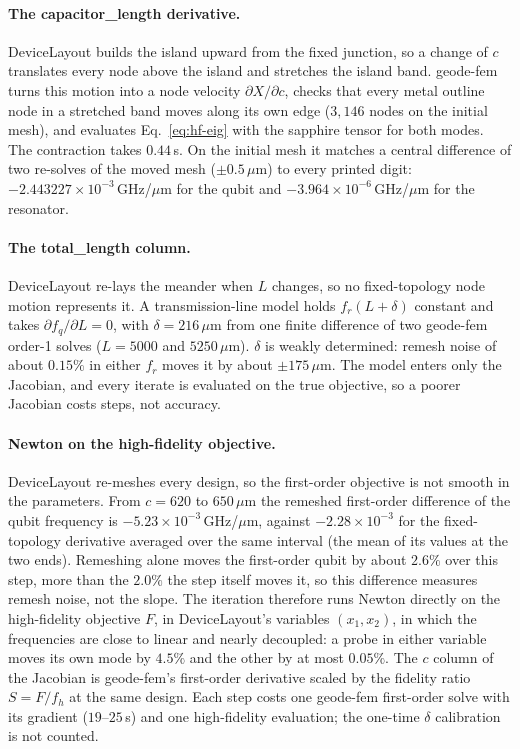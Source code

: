 \documentclass{anvil-paper}
\begin{document}
\paragraph{The capacitor\_length derivative.}
DeviceLayout builds the island upward from the fixed junction, so a change
of $c$ translates every node above the island and stretches the island
band. geode-fem turns this motion into a node velocity
$\partial X/\partial c$, checks that every metal outline node in a
stretched band moves along its own edge ($3{,}146$ nodes on the initial
mesh), and evaluates Eq.~\eqref{eq:hf-eig} with the sapphire tensor for both modes.
The contraction takes $0.44$\,s. On the initial mesh it matches a central
difference of two re-solves of the moved mesh ($\pm0.5\,\mu$m) to every
printed digit: $-2.443227\times10^{-3}$\,GHz/$\mu$m for the qubit and
$-3.964\times10^{-6}$\,GHz/$\mu$m for the resonator.

\paragraph{The total\_length column.}
DeviceLayout re-lays the meander when $L$ changes, so no fixed-topology
node motion represents it. A transmission-line model holds $f_r(L+\delta)$
constant and takes $\partial f_q/\partial L = 0$, with $\delta =
216\,\mu$m from one finite difference of two geode-fem order-1 solves
($L = 5000$ and $5250\,\mu$m). $\delta$ is weakly determined: remesh noise
of about $0.15\%$ in either $f_r$ moves it by about $\pm175\,\mu$m. The
model enters only the Jacobian, and every iterate is evaluated on the true
objective, so a poorer Jacobian costs steps, not accuracy.

\paragraph{Newton on the high-fidelity objective.}
DeviceLayout re-meshes every design, so the first-order objective is not
smooth in the parameters. From $c = 620$ to $650\,\mu$m the remeshed
first-order difference of the qubit frequency is
$-5.23\times10^{-3}$\,GHz/$\mu$m, against $-2.28\times10^{-3}$ for the
fixed-topology derivative averaged over the same interval (the mean of its
values at the two ends). Remeshing alone moves the first-order qubit by
about $2.6\%$ over this step, more than the $2.0\%$ the step itself moves
it, so this difference measures remesh noise, not the slope. The iteration
therefore runs Newton directly on the high-fidelity objective $F$, in
DeviceLayout's variables $(x_1, x_2)$, in which the frequencies are close
to linear and nearly decoupled: a probe in either variable moves its own
mode by $4.5\%$ and the other by at most $0.05\%$. The $c$ column of the
Jacobian is geode-fem's first-order derivative scaled by the fidelity
ratio $S = F/f_h$ at the same design. Each step costs one geode-fem
first-order solve with its gradient ($19$--$25$\,s) and one high-fidelity
evaluation; the one-time $\delta$ calibration is not counted.
\end{document}
